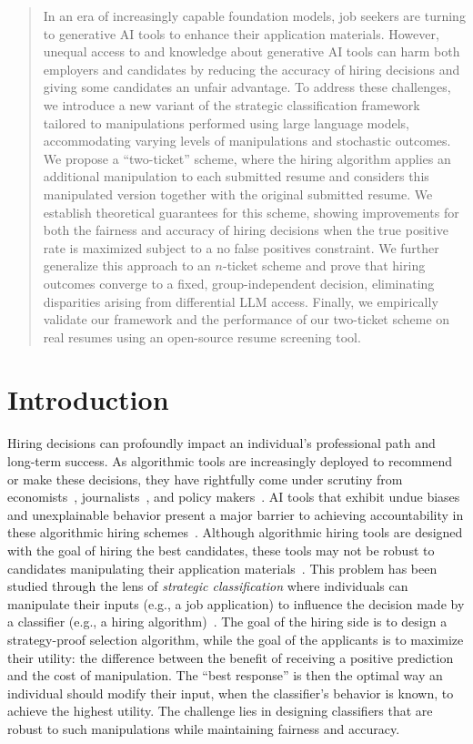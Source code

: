 \begin{abstract}
 

In an era of increasingly capable foundation models, job seekers are turning to generative AI tools to enhance their application materials. However, unequal access to and knowledge about generative AI tools can harm both employers and candidates by reducing the accuracy of hiring decisions and giving some candidates an unfair advantage. 
To address these challenges, we introduce a new variant of the strategic classification framework tailored to manipulations performed using large language models, accommodating varying levels of manipulations and stochastic outcomes. 
We propose a ``two-ticket'' scheme, where the hiring algorithm applies an additional manipulation to each submitted resume and considers this manipulated version together with the original submitted resume. We establish theoretical guarantees for this scheme, showing improvements for both the fairness and accuracy of hiring decisions when the true positive rate is maximized subject to a no false positives constraint. We further generalize this approach to an $n$-ticket scheme and prove that hiring outcomes converge to a fixed, group-independent decision, eliminating disparities arising from differential LLM access. Finally, we empirically validate our framework and the performance of our two-ticket scheme on real resumes using an open-source resume screening tool.



\end{abstract}

\section{Introduction}
Hiring decisions can profoundly impact an individual's professional path and long-term success. As algorithmic tools are increasingly deployed to recommend or make these decisions, they have rightfully come under scrutiny from economists~\citep{hu2018short, van2020hiring}, journalists~\citep{Lytton.2024}, and policy makers~\citep{cityofny}. AI tools that exhibit undue biases and unexplainable behavior present a major barrier to achieving accountability in these algorithmic hiring schemes~\citep{amazon_ai_bias}. Although algorithmic hiring tools are designed with the goal of hiring the best candidates, these tools may not be robust to candidates manipulating their application materials~\citep{ats_hack}. This problem has been studied through the lens of \textit{strategic classification} where individuals can manipulate their inputs (e.g., a job application) to influence the decision made by a classifier (e.g., a hiring algorithm)~\citep{Hardt2015,kleinberg2020classifiers, levanon2021strategic}. The goal of the hiring side is to design a strategy-proof selection algorithm, while the goal of the applicants is to maximize their utility: the difference between the benefit of receiving a positive prediction and the cost of manipulation. The ``best response'' is then the optimal way an individual should modify their input, when the classifier's behavior is known, to achieve the highest utility. The challenge lies in designing classifiers that are robust to such manipulations while maintaining fairness and accuracy.
    
